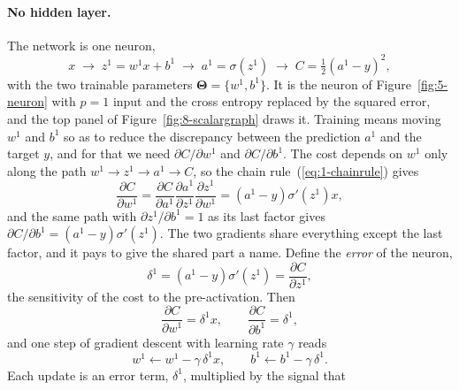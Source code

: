 \paragraph{No hidden layer.}
The network is one neuron,
\begin{equation}
  x \;\longrightarrow\; z^{1}=w^{1}x+b^{1}
    \;\longrightarrow\; a^{1}=\sigma\!\left(z^{1}\right)
    \;\longrightarrow\; C=\tfrac12\left(a^{1}-y\right)^{2},
  \label{eq:8-scalarone}
\end{equation}
with the two trainable parameters $\bm{\Theta}=\{w^{1},b^{1}\}$.  It is the
neuron of Figure~\ref{fig:5-neuron} with $p=1$ input and the cross entropy
replaced by the squared error, and the top panel of
Figure~\ref{fig:8-scalargraph} draws it.  Training means moving $w^{1}$ and
$b^{1}$ so as to reduce the discrepancy between the prediction $a^{1}$ and the
target $y$, and for that we need $\partial C/\partial w^{1}$ and
$\partial C/\partial b^{1}$.  The cost depends on $w^{1}$ only along the path
$w^{1}\to z^{1}\to a^{1}\to C$, so the chain rule~(\ref{eq:1-chainrule}) gives
\begin{equation}
  \frac{\partial C}{\partial w^{1}}
   = \frac{\partial C}{\partial a^{1}}
     \frac{\partial a^{1}}{\partial z^{1}}
     \frac{\partial z^{1}}{\partial w^{1}}
   = \left(a^{1}-y\right)\sigma'\!\left(z^{1}\right)x ,
  \label{eq:8-scalaronew}
\end{equation}
and the same path with $\partial z^{1}/\partial b^{1}=1$ as its last factor
gives $\partial C/\partial b^{1}=(a^{1}-y)\sigma'(z^{1})$.  The two gradients
share everything except the last factor, and it pays to give the shared part
a name.  Define the \emph{error} of the neuron,
\begin{equation}
  \delta^{1} = \left(a^{1}-y\right)\sigma'\!\left(z^{1}\right)
             = \frac{\partial C}{\partial z^{1}} ,
  \label{eq:8-scalardelta}
\end{equation}
the sensitivity of the cost to the pre-activation.  Then
\begin{equation}
  \frac{\partial C}{\partial w^{1}} = \delta^{1}x,
  \qquad
  \frac{\partial C}{\partial b^{1}} = \delta^{1},
  \label{eq:8-scalargrad}
\end{equation}
and one step of gradient descent with learning rate $\gamma$ reads
\begin{equation}
  w^{1}\leftarrow w^{1}-\gamma\,\delta^{1}x ,
  \qquad
  b^{1}\leftarrow b^{1}-\gamma\,\delta^{1} .
  \label{eq:8-scalarupdate}
\end{equation}
Each update is an error term, $\delta^{1}$, multiplied by the signal that
